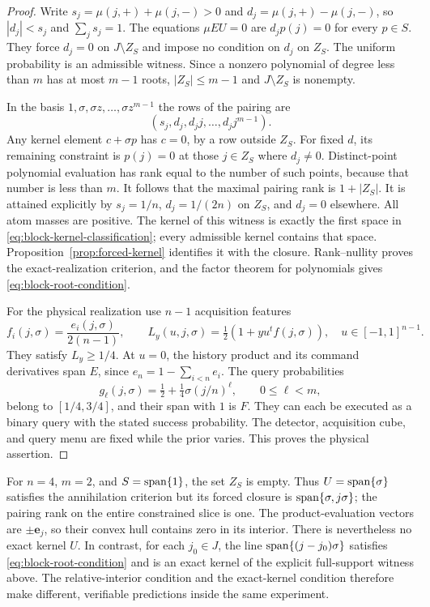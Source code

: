 \begin{proof}
Write $s_j=\mu(j,+)+\mu(j,-)>0$ and
$d_j=\mu(j,+)-\mu(j,-)$, so $|d_j|<s_j$ and $\sum_j s_j=1$.
The equations $\mu E U=0$ are $d_jp(j)=0$ for every $p\in S$.
They force $d_j=0$ on $J\setminus Z_S$ and impose no condition on
$d_j$ on $Z_S$. The uniform probability is an admissible witness.
Since a nonzero polynomial of degree less than $m$ has at most $m-1$
roots, $|Z_S|\le m-1$ and $J\setminus Z_S$ is nonempty.

In the basis $1,\sigma,\sigma z,\ldots,\sigma z^{m-1}$ the rows of
the pairing are
\[
 (s_j,d_j,d_jj,\ldots,d_jj^{m-1}).
\]
Any kernel element $c+\sigma p$ has $c=0$, by a row outside $Z_S$.
For fixed $d$, its remaining constraint is $p(j)=0$ at those $j\in Z_S$
where $d_j\ne0$. Distinct-point polynomial evaluation has rank equal
to the number of such points, because that number is less than $m$.
It follows that the maximal pairing rank is $1+|Z_S|$. It is attained
explicitly by $s_j=1/n$, $d_j=1/(2n)$ on $Z_S$, and $d_j=0$
elsewhere. All atom masses are positive. The kernel of this witness is
exactly the first space in \eqref{eq:block-kernel-classification}; every
admissible kernel contains that space. Proposition~\ref{prop:forced-kernel}
identifies it with the closure. Rank--nullity proves the exact-realization
criterion, and the factor theorem for polynomials gives
\eqref{eq:block-root-condition}.

For the physical realization use $n-1$ acquisition features
\[
 f_i(j,\sigma)=\frac{e_i(j,\sigma)}{2(n-1)},\qquad
 L_y(u,j,\sigma)=\tfrac12(1+y u^tf(j,\sigma)),
 \quad u\in[-1,1]^{n-1}.
\]
They satisfy $L_y\ge1/4$. At $u=0$, the history product and its command
derivatives span $E$, since $e_n=1-\sum_{i<n}e_i$. The query
probabilities
\[
 g_\ell(j,\sigma)=\tfrac12+\tfrac14\sigma(j/n)^\ell,
 \qquad 0\le\ell<m,
\]
belong to $[1/4,3/4]$, and their span with $1$ is $F$. They can each
be executed as a binary query with the stated success probability.
The detector, acquisition cube, and query menu are fixed while the
prior varies. This proves the physical assertion.
\end{proof}

For $n=4$, $m=2$, and $S=\operatorname{span}\{1\}$, the set $Z_S$ is empty.
Thus $U=\operatorname{span}\{\sigma\}$ satisfies the annihilation criterion but
its forced closure is $\operatorname{span}\{\sigma,j\sigma\}$; the pairing rank
on the entire constrained slice is one. The product-evaluation vectors
are $\pm\mathbf e_j$, so their convex hull contains zero in its
interior. There is nevertheless no exact kernel $U$. In contrast, for
each $j_0\in J$, the line $\operatorname{span}\{(j-j_0)\sigma\}$ satisfies
\eqref{eq:block-root-condition} and is an exact kernel of the explicit
full-support witness above. The relative-interior condition and the
exact-kernel condition therefore make different, verifiable predictions
inside the same experiment.

